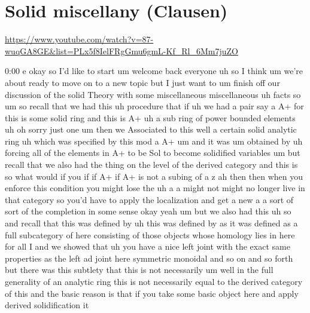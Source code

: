 
\section{\ufs Solid miscellany (Clausen)}

\url{https://www.youtube.com/watch?v=87-wuqGA8GE&list=PLx5f8IelFRgGmu6gmL-Kf_Rl_6Mm7juZO}
\renewcommand{\yt}[2]{\href{https://www.youtube.com/watch?v=87-wuqGA8GE&list=PLx5f8IelFRgGmu6gmL-Kf_Rl_6Mm7juZO&t=#1}{#2}}
\vspace{1em}

\begin{unfinished}{0:00}
e
okay  so  I'd  like  to  start  um  welcome
back  everyone  uh  so  I  think  um  we're
about  ready  to  move  on  to  a  new  topic
but  I  just  want  to  um  finish  off  our
discussion  of  the  solid  Theory  with  some
miscellaneous
miscellaneous  uh  facts
so
um  so
recall  that  we  had  this  uh  procedure
that  if  uh  we  had  a  pair  say  a  A+  for
this  is  some  solid
ring  and  this  is  A+  uh  a  sub
ring  of  power  bounded
elements  uh  oh  sorry  just  one
um  then  we  Associated  to  this  well  a
certain  solid  analytic  ring  uh  which
was  specified  by  this  mod  a
A+
um  and  it  was  um  obtained  by  uh  forcing
all  of  the  elements  in  A+  to  be  Sol  to
become  solidified
variables  um  but  recall  that  we  also  had
the  thing  on  the  level  of  the  derived
category  and  this  is  so  what  would  if
you  if  if
A+  if  A+  is  not  a  subing  of  a  z  ah  then
then  when  you  enforce  this  condition  you
might  lose  the  uh  a  a  might  not  might  no
longer  live  in  that
category  so  you'd  have  to  apply  the
localization  and  get  a  new  a  a  sort  of
sort  of  the  completion  in  some  sense
okay
yeah  um  but  we  also  had  this
uh
so  and  recall  that  this  was  defined  by
uh  this  was  defined  by  as  it  was  defined
as  a  full  subcategory  of  here  consisting
of  those  objects  whose  homology  lies  in
here  for  all  I  and  we  showed  that  uh  you
have  a  nice  left  joint  with  the  exact
same  properties  as  the  left  ad  joint
here  symmetric  monoidal  and  so  on  and  so
forth  but  there  was  this  subtlety  that
this  is  not  necessarily  um  well  in  the
full  generality  of  an  analytic  ring  this
is  not  necessarily  equal  to  the  derived
category  of  this  and  the  basic  reason  is
that  if  you  take  some  basic  object  here
and  apply  derived  solidification  it

\end{unfinished}
